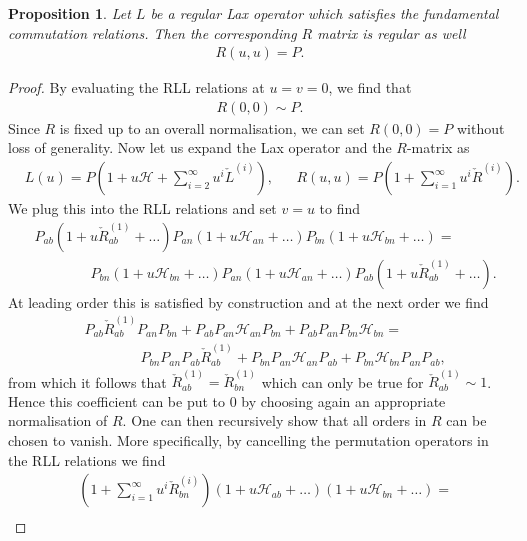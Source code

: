 \documentclass{article}
\newtheorem{prop}{Proposition}
\begin{document}
\begin{prop}\label{lem:RegularRLL}
Let $L$ be a regular Lax operator which satisfies the fundamental commutation relations. Then the corresponding $R$ matrix is regular as well
%
\begin{align}
R(u,u) = P.
\end{align}
% 
\end{prop}
\begin{proof}
By evaluating the RLL relations at $u=v=0$, we find that
%
\begin{align}
R(0,0) \sim P.
\end{align}
%
Since $R$ is fixed up to an overall normalisation, we can set $R(0,0)=P$ without loss of generality. Now let us expand the Lax operator  and the $R$-matrix as
%
\begin{align}\label{eq:Lexpand}
&L(u) = P(1+ u \mathcal{H} + \sum_{i=2}^\infty u^i \check{L}^{(i)} ),
&& R(u,u) = P(1+ \sum^\infty_{i=1} u^i \check{R}^{(i)} ).
\end{align}
%
We plug this into the RLL relations and set $v=u$ to find
%
\begin{align}
&P_{ab}(1+ u \check{R}_{ab}^{(1)} + \ldots) P_{an}(1+u \mathcal{H}_{an} +\ldots) P_{bn}(1+u \mathcal{H}_{bn} +\ldots) =\nonumber  \\
 &\qquad \qquad P_{bn}(1+u \mathcal{H}_{bn} +\ldots) P_{an}(1+u \mathcal{H}_{an} +\ldots) P_{ab}(1+ u \check{R}_{ab}^{(1)} + \ldots).
\end{align}
%
At leading order this is satisfied by construction and at the next order we find
%
\begin{align}
&P_{ab}  \check{R}_{ab}^{(1)} P_{an} P_{bn} + P_{ab}  P_{an} \mathcal{H}_{an}P_{bn} + P_{ab} P_{an} P_{bn} \mathcal{H}_{bn}
=\nonumber  \\
 &\qquad \qquad 
 P_{bn}P_{an}  P_{ab}  \check{R}_{ab}^{(1) }+  P_{bn}  P_{an} \mathcal{H}_{an}P_{ab} +  P_{bn} \mathcal{H}_{bn}P_{an}P_{ab} ,
\end{align}
%
from which it follows that $\check{R}_{ab}^{(1)} =\check{R}_{bn}^{(1)}$ which can only be true for $\check{R}_{ab}^{(1)} \sim 1$. Hence this coefficient can be put to 0 by choosing again an appropriate normalisation of $R$. One can then recursively show that all orders in $R$ can be chosen to vanish. More specifically, by cancelling the permutation operators in the RLL relations we find
%
\begin{align}
&(1+ \sum^\infty_{i=1} u^i \check{R}^{(i)}_{bn} )(1+u \mathcal{H}_{ab} +\ldots)(1+u \mathcal{H}_{bn} +\ldots) 
=\nonumber\\

\end{align}
\end{proof}
\end{document}
